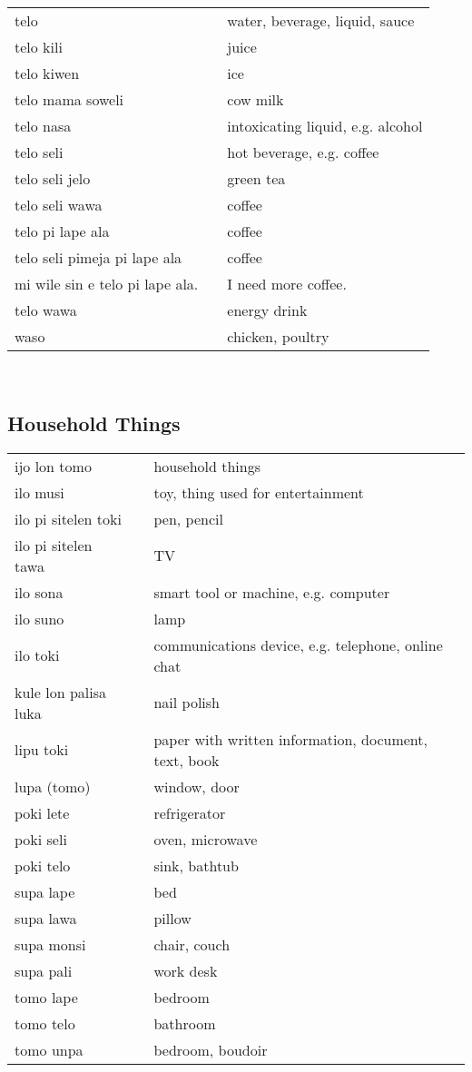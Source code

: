 \begin{supertabular}{p{4,5cm}|ll}
telo && water, beverage, liquid, sauce \\
telo kili && juice \\
telo kiwen && ice \\
telo mama soweli && cow milk \\
telo nasa && intoxicating liquid, e.g. alcohol \\
telo seli && hot beverage, e.g. coffee \\
telo seli jelo && green tea \\ 
telo seli wawa && coffee \\
telo pi lape ala && coffee \\
telo seli pimeja pi lape ala && coffee \\
mi wile sin e telo pi lape ala. && I need more coffee. \\
telo wawa && energy drink \\
waso && chicken, poultry \\
\end{supertabular} \\
%
%
\subsection{Household Things}
%
\begin{supertabular}{p{4,5cm}|ll}
ijo lon tomo && household things \\
ilo musi && toy, thing used for entertainment \\
ilo pi sitelen toki && pen, pencil \\
ilo pi sitelen tawa && TV \\
ilo sona && smart tool or machine, e.g. computer \\
ilo suno && lamp \\
ilo toki && communications device, e.g. telephone, online chat \\
kule lon palisa luka && nail polish \\
lipu toki && paper with written information, document, text, book \\
lupa (tomo) && window, door \\
poki lete && refrigerator \\
poki seli && oven, microwave \\
poki telo && sink, bathtub \\
supa lape && bed \\
supa lawa && pillow \\
supa monsi && chair, couch \\
supa pali && work desk \\
tomo lape && bedroom \\
tomo telo && bathroom \\
tomo unpa && bedroom, boudoir \\
\end{supertabular} \\
%
%
